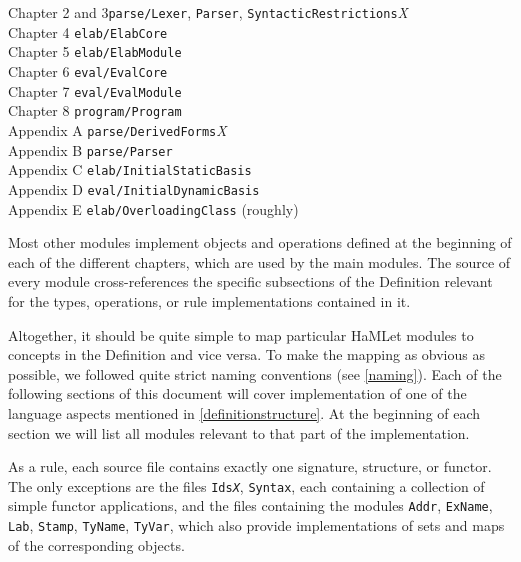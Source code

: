 \documentclass[twoside,titlepage]{article}
\begin{document}
\begin{quoting}
\begin{tabbing}
Chapter 2 and 3\qquad\= {\tt parse/Lexer}, {\tt Parser}, {\tt SyntacticRestrictions}{\it X} \\
Chapter 4	\> {\tt elab/ElabCore} \\
Chapter 5	\> {\tt elab/ElabModule} \\
Chapter 6	\> {\tt eval/EvalCore} \\
Chapter 7	\> {\tt eval/EvalModule} \\
Chapter 8	\> {\tt program/Program} \\
Appendix A	\> {\tt parse/DerivedForms}{\it X} \\
Appendix B	\> {\tt parse/Parser} \\
Appendix C	\> {\tt elab/InitialStaticBasis} \\
Appendix D	\> {\tt eval/InitialDynamicBasis} \\
Appendix E	\> {\tt elab/OverloadingClass} (roughly)
\end{tabbing}
\end{quoting}

Most other modules implement objects and operations defined at the beginning of each of the different chapters, which are used by the main modules. The source of every module cross-references the specific subsections of the Definition relevant for the types, operations, or rule implementations contained in it.

Altogether, it should be quite simple to map particular HaMLet modules to concepts in the Definition and vice versa. To make the mapping as obvious as possible, we followed quite strict naming conventions (see \ref{naming}). Each of the following sections of this document will cover implementation of one of the language aspects mentioned in \ref{definitionstructure}. At the beginning of each section we will list all modules relevant to that part of the implementation.

As a rule, each source file contains exactly one signature, structure, or functor. The only exceptions are the files {\tt Ids{\sl{X}}}, {\tt Syntax}, each containing a collection of simple functor applications, and the files containing the modules {\tt Addr}, {\tt ExName}, {\tt Lab}, {\tt Stamp}, {\tt TyName}, {\tt TyVar}, which also provide implementations of sets and maps of the corresponding objects.

\end{document}

